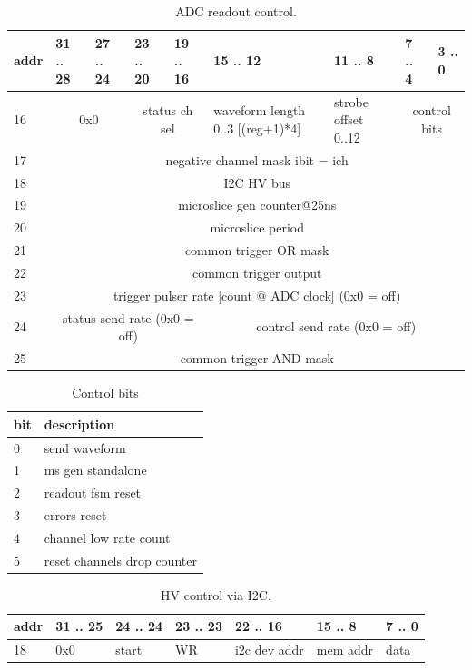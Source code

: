 \documentclass{article}
\begin{document}
\begin{table}[H]
\centering
\begin{tabular}{| l | l | l | l | l | l | l | l | l |}
\hline
addr & 31 .. 28 & 27 .. 24 & 23 .. 20 & 19 .. 16 & 15 .. 12 & 11 .. 8 & 7 .. 4 & 3 .. 0 \\ \hline
16 & \multicolumn{2}{c|}{0x0} & \multicolumn{2}{c|}{status ch sel} & waveform length 0..3 [(reg+1)*4] & strobe offset 0..12 & \multicolumn{2}{c|}{control bits} \\ \hline
17 & \multicolumn{8}{c|}{negative channel mask ibit = ich} \\ \hline
18 & \multicolumn{8}{c|}{I2C HV bus} \\ \hline
19 & \multicolumn{8}{c|}{microslice gen counter@25ns} \\ \hline
20 & \multicolumn{8}{c|}{microslice period} \\ \hline
21 & \multicolumn{8}{c|}{common trigger OR mask} \\ \hline
22 & \multicolumn{8}{c|}{common trigger output} \\ \hline
23 & \multicolumn{8}{c|}{trigger pulser rate [count @ ADC clock] (0x0 = off)} \\ \hline
24 & \multicolumn{4}{c|}{status send rate (0x0 = off)}& \multicolumn{4}{c|}{control send rate (0x0 = off)} \\ \hline
25 & \multicolumn{8}{c|}{common trigger AND mask} \\
\hline
\end{tabular}
\caption{ADC readout control.}
\end{table}

\begin{table}[H]
\centering
\begin{tabular}{| l | l |}
\hline
bit & description \\ \hline
0 & send waveform \\ \hline
1 & ms gen standalone \\ \hline
2 & readout fsm reset \\ \hline
3 & errors reset \\ \hline
4 & channel low rate count \\ \hline
5 & reset channels drop counter \\ \hline
\end{tabular}
\caption{Control bits\label{tab6}}
\end{table}

\begin{table}[H]
\centering
\begin{tabular}{| l | l | l | l | l | l | l |}
\hline
addr & 31 .. 25 & 24 .. 24 & 23 .. 23 & 22 .. 16 & 15 .. 8 & 7 .. 0 \\ \hline
18 & 0x0 & start & WR & i2c dev addr & mem addr & data \\ \hline
\end{tabular}
\caption{HV control via I2C.\label{tab7}}
\end{table}
\end{document}

